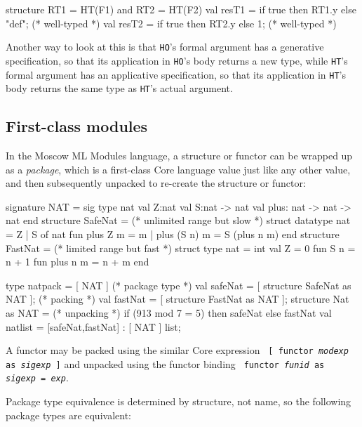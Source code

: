 \documentclass[fleqn,a4paper]{article}
\begin{document}
\begin{program}
structure RT1 = HT(F1) and RT2 = HT(F2)
val resT1 = if true then RT1.y else "def";            (* well-typed *)
val resT2 = if true then RT2.y else 1;                (* well-typed *)
\end{program}

\noindent 
Another way to look at this is that \texttt{HO}'s formal argument has
a generative specification, so that its application in {\tt HO}'s  body returns
a new type,  while
\texttt{HT}'s formal argument has an
applicative specification, so that its application in {\tt HT}'s body
returns the same type as \texttt{HT}'s actual argument.

\subsection{First-class modules}

\label{sec-firstclass-modules}

In the Moscow ML Modules language, a structure or functor can be
wrapped up as a \emph{package}, which is a first-class Core language
value just like any other value, and then subsequently unpacked to
re-create the structure or functor:

\begin{program}
signature NAT = sig type nat  val Z:nat  val S:nat -> nat  val plus: nat -> nat -> nat end
structure SafeNat =  (* unlimited range but slow *)
  struct datatype nat = Z | S of nat  fun plus Z m = m | plus (S n) m = S (plus n m) end
structure FastNat =  (* limited range but fast *)
  struct type nat = int  val Z = 0  fun S n = n + 1  fun plus n m = n + m end

type natpack = [ NAT ]                                (* package type *)
val safeNat = [ structure SafeNat as NAT ];           (* packing      *)
val fastNat = [ structure FastNat as NAT ];    
structure Nat as NAT =                                (* unpacking    *)
      if (913 mod 7 = 5) then safeNat else fastNat
val natlist = [safeNat,fastNat] : [ NAT ] list;
\end{program}

\noindent 
A functor may be packed using the similar Core expression
\texttt{ [ functor {\it modexp} as {\it sigexp} ]} and unpacked using
the functor binding \texttt{ functor {\it funid} as {\it sigexp} =
  {\it exp}}.

Package type equivalence is determined by structure, not name, so the
following package types are equivalent:
\end{document}
